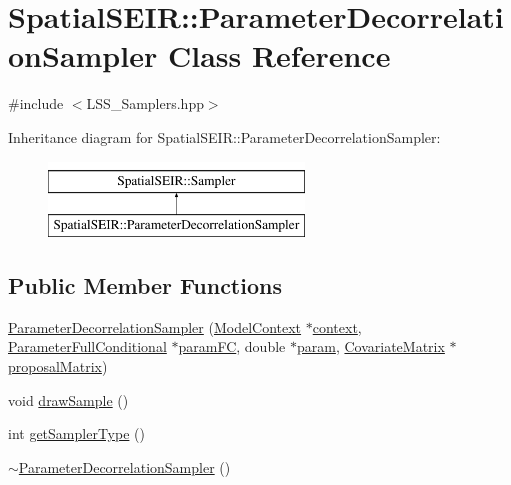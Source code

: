\hypertarget{classSpatialSEIR_1_1ParameterDecorrelationSampler}{\section{Spatial\-S\-E\-I\-R\-:\-:Parameter\-Decorrelation\-Sampler Class Reference}
\label{classSpatialSEIR_1_1ParameterDecorrelationSampler}
}


{\ttfamily \#include $<$L\-S\-S\-\_\-\-Samplers.\-hpp$>$}

Inheritance diagram for Spatial\-S\-E\-I\-R\-:\-:Parameter\-Decorrelation\-Sampler\-:\begin{figure}[H]
\begin{center}
\leavevmode
\includegraphics[height=2.000000cm]{classSpatialSEIR_1_1ParameterDecorrelationSampler}
\end{center}
\end{figure}
\subsection*{Public Member Functions}
\begin{DoxyCompactItemize}
\item 
\hyperlink{classSpatialSEIR_1_1ParameterDecorrelationSampler_af0361fd63d2070725aa4828b651375b7}{Parameter\-Decorrelation\-Sampler} (\hyperlink{classSpatialSEIR_1_1ModelContext}{Model\-Context} $\ast$\hyperlink{classSpatialSEIR_1_1ParameterDecorrelationSampler_a6d3abd37e28042269b7e46bd1dbf45f6}{context}, \hyperlink{classSpatialSEIR_1_1ParameterFullConditional}{Parameter\-Full\-Conditional} $\ast$\hyperlink{classSpatialSEIR_1_1ParameterDecorrelationSampler_a68fd577ec24b82e53d6f0e3db8227642}{param\-F\-C}, double $\ast$\hyperlink{classSpatialSEIR_1_1ParameterDecorrelationSampler_a4861d8e4ed1613da5b636535b1878ff5}{param}, \hyperlink{classSpatialSEIR_1_1CovariateMatrix}{Covariate\-Matrix} $\ast$\hyperlink{classSpatialSEIR_1_1ParameterDecorrelationSampler_afacba79f68960c5f287fe7551d39cb28}{proposal\-Matrix})
\item 
void \hyperlink{classSpatialSEIR_1_1ParameterDecorrelationSampler_ad1242cb40cf8a47667b3cbe82eff9c47}{draw\-Sample} ()
\item 
int \hyperlink{classSpatialSEIR_1_1ParameterDecorrelationSampler_ad3039ef7f917ec85fc210be2940b5da1}{get\-Sampler\-Type} ()
\item 
\hyperlink{classSpatialSEIR_1_1ParameterDecorrelationSampler_a5c10a71c09faa7026c2872a3cbc019d6}{$\sim$\-Parameter\-Decorrelation\-Sampler} ()
\end{DoxyCompactItemize}

